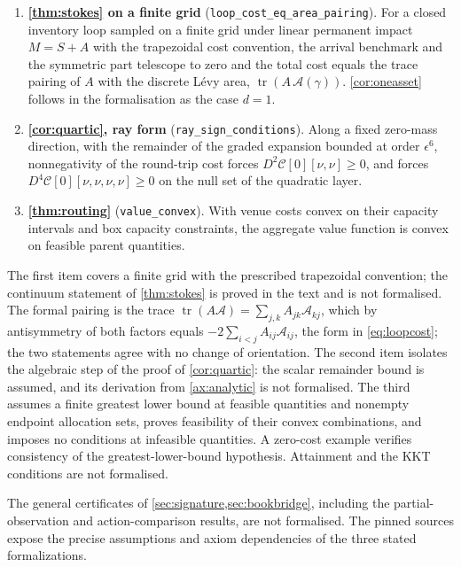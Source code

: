 \documentclass[11pt]{article}
\numberwithin{equation}{section}
\theoremstyle{definition}
\theoremstyle{remark}
\theoremstyle{definition}
\begin{document}
\begin{enumerate}[leftmargin=*]
\item \textbf{\cref{thm:stokes} on a finite grid}
  (\texttt{loop\_cost\_eq\_area\_pairing}). For a closed inventory loop
  sampled on a finite grid under linear permanent impact $M=S+A$ with the
  trapezoidal cost convention, the arrival benchmark and the symmetric part
  telescope to zero and the total cost equals the trace pairing of $A$ with
  the discrete L\'evy area, $\operatorname{tr}(A\,\mathcal A(\gamma))$.
  \cref{cor:oneasset} follows in the formalisation as the case $d=1$.
\item \textbf{\cref{cor:quartic}, ray form}
  (\texttt{ray\_sign\_conditions}). Along a fixed zero-mass direction, with
  the remainder of the graded expansion bounded at order $\epsilon^6$,
  nonnegativity of the round-trip cost forces $D^2\mathcal C[0][\nu,\nu]\ge0$,
  and forces $D^4\mathcal C[0][\nu,\nu,\nu,\nu]\ge0$ on the null set of the
  quadratic layer.
\item \textbf{\cref{thm:routing}} (\texttt{value\_convex}). With
  venue costs convex on their capacity intervals and box capacity constraints,
  the aggregate value function is convex on feasible parent quantities.
\end{enumerate}

The first item covers a finite grid with the prescribed trapezoidal
convention; the continuum statement of \cref{thm:stokes} is proved in the
text and is not formalised. The formal pairing is the trace
$\operatorname{tr}(A\mathcal A)=\sum_{j,k}A_{jk}\mathcal A_{kj}$, which by
antisymmetry of both factors equals $-2\sum_{i<j}A_{ij}\mathcal A_{ij}$, the
form in \eqref{eq:loopcost}; the two statements agree with no change of
orientation. The second item isolates the algebraic step of the proof of
\cref{cor:quartic}: the scalar remainder bound is assumed, and its
derivation from \cref{ax:analytic} is not formalised. The third assumes a
finite greatest lower bound at feasible quantities and nonempty endpoint
allocation sets, proves feasibility of their convex combinations, and
imposes no conditions at infeasible quantities. A zero-cost example verifies
consistency of the greatest-lower-bound hypothesis. Attainment and the KKT
conditions are not formalised.

The general certificates of \cref{sec:signature,sec:bookbridge}, including
the partial-observation and action-comparison results, are not formalised.
The pinned sources expose the precise assumptions and axiom dependencies
of the three stated formalizations.
\end{document}

